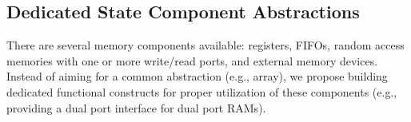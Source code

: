 \subsection{Dedicated State Component Abstractions}
There are several memory components available: registers, FIFOs, random access memories with one or more write/read ports, and external memory devices. Instead of aiming for a common abstraction (e.g., array), we propose building dedicated functional constructs for proper utilization of these components (e.g., providing a dual port interface for dual port RAMs).


